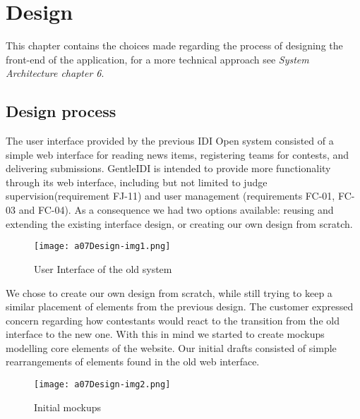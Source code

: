 \chapter{Design}
This chapter contains the choices made regarding the process of
designing the front-end of the application, for a more technical
approach see \textit{System Architecture chapter 6}.

\section{Design process}
\label{sec:designProcess}

The user interface provided by the previous IDI Open system consisted of
a simple web interface for reading news items, registering teams for
contests, and delivering submissions. GentleIDI is intended to provide
more functionality through its web interface, including but not limited
to judge supervision(requirement FJ-11) and user management 
(requirements FC-01, FC-03 and FC-04). As a consequence
we had two options available: reusing and extending the existing
interface design, or creating our own design from scratch.

\begin{figure}[h!]
	\texttt{[image: a07Design-img1.png]} 
	\caption{User Interface of the old system}
	\label{fig:oldSystem}
\end{figure}

We chose to create our own design from scratch, while still trying to
keep a similar placement of elements from the previous design. The
customer expressed concern regarding how contestants would react to the
transition from the old interface to the new one. With this in mind we
started to create mockups modelling core elements of the website. Our
initial drafts consisted of simple rearrangements of elements found in
the old web interface.

\begin{figure}[h!]
	\texttt{[image: a07Design-img2.png]} 
	\caption{Initial mockups}
	\label{fig:mockup}
\end{figure}

